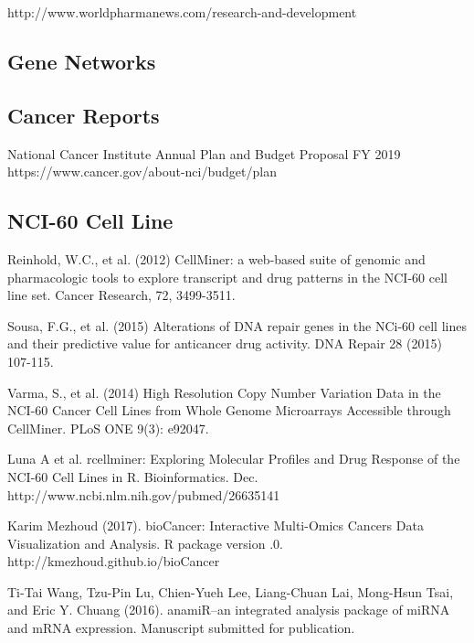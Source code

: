  http://www.worldpharmanews.com/research-and-development

\subsection{Gene Networks}
	

\subsection{Cancer Reports}
	
 National Cancer Institute
\newblock Annual Plan and Budget Proposal FY 2019
\newblock https://www.cancer.gov/about-nci/budget/plan 


\subsection{NCI-60 Cell Line}

Reinhold, W.C., et al. (2012) 
\newblock CellMiner: a web-based suite of genomic and pharmacologic tools to explore transcript and drug patterns in the NCI-60 cell line set. 
\newblock Cancer Research, 72, 3499-3511.

Sousa, F.G., et al. (2015) 
\newblock Alterations of DNA repair genes in the NCi-60 cell lines and their predictive value for anticancer drug activity. 
\newblock DNA Repair 28 (2015) 107-115.

Varma, S., et al. (2014) 
\newblock High Resolution Copy Number Variation Data in the NCI-60 Cancer Cell Lines from Whole Genome Microarrays Accessible through CellMiner. 
\newblock PLoS ONE 9(3): e92047.

 Luna A et al. rcellminer: Exploring Molecular Profiles and
\newblock Drug Response of the NCI-60 Cell Lines in R. Bioinformatics.
 Dec. http://www.ncbi.nlm.nih.gov/pubmed/26635141

Karim Mezhoud (2017). bioCancer: Interactive Multi-Omics
\newblock Cancers Data Visualization and Analysis. R package version
.0. http://kmezhoud.github.io/bioCancer

Ti-Tai Wang, Tzu-Pin Lu, Chien-Yueh Lee, Liang-Chuan Lai, Mong-Hsun Tsai, and Eric Y. Chuang (2016). 
\newblock anamiR--an integrated analysis package of miRNA and mRNA expression.
\newblock Manuscript submitted for publication.

